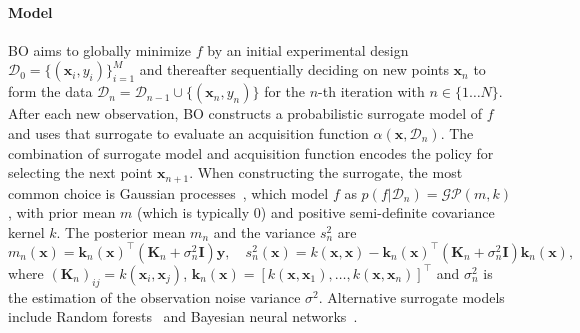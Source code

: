 \documentclass{article}
\newcommand{\frank}[1]{\todo[color=yellow]{Frank: #1}} %
\newcommand{\luigi}[1]{\todo[color=orange]{Luigi: #1}}
\begin{document}
\paragraph{Model}
BO aims to globally minimize $f$ by an initial experimental design \mbox{$\mathcal{D}_0 = \{(\bm{x}_i, y_i)\}^M_{i=1}$} and thereafter sequentially deciding on new points $\bm{x}_n$ to form the data $\mathcal{D}_n = \mathcal{D}_{n-1} \cup \{{(\bm{x}_n, y_n)}\}$ for the $n$-th iteration with $n \in \{1 \ldots N\}$. After each new observation, BO constructs a probabilistic surrogate model of $f$ and uses that surrogate to evaluate an acquisition function $\alpha(\bm{x}, \mathcal{D}_n)$. The combination of surrogate model and acquisition function encodes the policy for selecting the next point $\bm{x}_{n+1}$. When constructing the surrogate, the most common choice is Gaussian processes~\citep{rasmussen-book06a}, which model $f$ as $p(f|\mathcal{D}_n) = \mathcal{GP}(m, k)$, 
with prior mean $m$ (which is typically $0$) and positive semi-definite covariance kernel $k$. The posterior mean $m_n$ and the variance $s_n^2$ are 
\begin{equation}
    m_n(\bm{x}) = \mathbf{k}_n(\bm{x})^\top(\mathbf{K}_n + \sigma_n^2\mathbf{I})\mathbf{y},\quad
    s_n^2(\bm{x}) =  k(\bm{x}, \bm{x}) - \mathbf{k}_n(\bm{x})^\top(\mathbf{K}_n + \sigma_n^2\mathbf{I})\mathbf{k}_n(\bm{x}),
\end{equation}
where $(\mathbf{K}_n)_{ij} = k(\bm{x}_i, \bm{x}_j)$, $\mathbf{k}_n(\bm{x}) = [k (\bm{x}, \bm{x}_1), \ldots, k(\bm{x}, \bm{x}_n)]^\top$ and $\sigma^2_n$ is the estimation of the observation noise variance $\sigma^2$. Alternative surrogate models include Random forests~\citep{smac} and Bayesian neural networks~\citep{springenberg-nips2016}.
\end{document}
